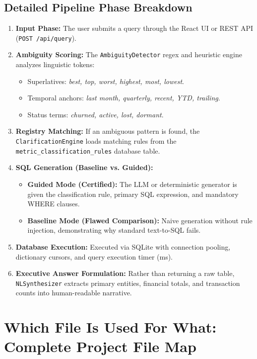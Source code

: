 \documentclass[10pt,a4paper]{article}
\begin{document}
\subsection{Detailed Pipeline Phase Breakdown}
\begin{enumerate}[leftmargin=*]
    \item \textbf{Input Phase:} The user submits a query through the React UI or REST API (\texttt{POST /api/query}).
    \item \textbf{Ambiguity Scoring:} The \texttt{AmbiguityDetector} regex and heuristic engine analyzes linguistic tokens:
    \begin{itemize}
        \item Superlatives: \textit{best, top, worst, highest, most, lowest}.
        \item Temporal anchors: \textit{last month, quarterly, recent, YTD, trailing}.
        \item Status terms: \textit{churned, active, lost, dormant}.
    \end{itemize}
    \item \textbf{Registry Matching:} If an ambiguous pattern is found, the \texttt{ClarificationEngine} loads matching rules from the \texttt{metric\_classification\_rules} database table.
    \item \textbf{SQL Generation (Baseline vs. Guided):}
    \begin{itemize}
        \item \textbf{Guided Mode (Certified):} The LLM or deterministic generator is given the classification rule, primary SQL expression, and mandatory WHERE clauses.
        \item \textbf{Baseline Mode (Flawed Comparison):} Naive generation without rule injection, demonstrating why standard text-to-SQL fails.
    \end{itemize}
    \item \textbf{Database Execution:} Executed via SQLite with connection pooling, dictionary cursors, and query execution timer (ms).
    \item \textbf{Executive Answer Formulation:} Rather than returning a raw table, \texttt{NLSynthesizer} extracts primary entities, financial totals, and transaction counts into human-readable narrative.
\end{enumerate}

\newpage
\section{Which File Is Used For What: Complete Project File Map}
\end{document}
